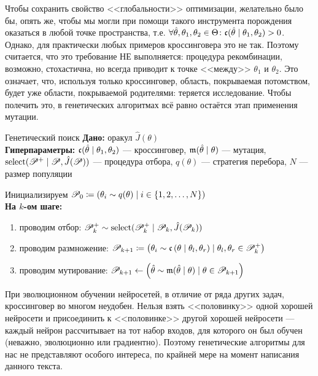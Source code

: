 Чтобы сохранить свойство <<глобальности>> оптимизации, желательно было бы, опять же, чтобы мы могли при помощи такого инструмента порождения оказаться в любой точке пространства, т.е. $\forall \hat{\theta}, \theta_1, \theta_2 \HM\in \Theta \colon \cross(\hat{\theta} \HM\mid \theta_1, \theta_2) > 0$. Однако, для практически любых примеров кроссинговера это не так. Поэтому считается, что это требование НЕ выполняется: процедура рекомбинации, возможно, стохастична, но всегда приводит к точке <<между>> $\theta_1$ и $\theta_2$. Это означает, что, используя только кроссинговер, область, покрываемая потомством, будет уже области, покрываемой родителями: теряется исследование. Чтобы полечить это, в генетических алгоритмах всё равно остаётся этап применения мутации.

\begin{algorithm}[label=geneticsearch]{Генетический поиск}
\textbf{Дано:} оракул $\hat{J}(\theta)$ \\
\textbf{Гиперпараметры:} $\mathfrak{c}(\hat{\theta} \mid \theta_1, \theta_2)$ --- кроссинговер, $\mathfrak{m}(\hat{\theta} \mid \theta)$ --- мутация, $\mathrm{select}(\mathscr{P}^+ \mid \mathscr{P}, \hat{J}(\mathscr{P}))$ --- процедура отбора, $q(\theta)$ --- стратегия перебора, $N$ --- размер популяции

\vspace{0.3cm}
Инициализируем $\mathscr{P}_0 \coloneqq \left( \theta_i \sim q(\theta) \mid i \in \{1, 2, \dots , N \} \right)$ \\
\textbf{На $k$-ом шаге:}
\begin{enumerate}
    \item проводим отбор: $\mathscr{P}^{+}_k \sim \mathrm{select}(\mathscr{P}^{+}_k \mid \mathscr{P}_k, \hat{J}(\mathscr{P}_k))$
    \item проводим размножение: $\mathscr{P}_{k+1} \coloneqq \left( \theta_i \sim \mathfrak{c} \left( \theta \mid \theta_l, \theta_r \right) \mid \theta_l, \theta_r \in \mathscr{P}^{+}_k \right)$
    \item проводим мутирование: $\mathscr{P}_{k+1} \leftarrow \left( \hat{\theta} \sim \mathfrak{m} (\hat{\theta} \mid \theta) \mid \theta \in \mathscr{P}_{k+1} \right)$
\end{enumerate}
\end{algorithm}

\begin{remark}
При эволюционном обучении нейросетей, в отличие от ряда других задач, кроссинговер во многом неудобен. Нельзя взять <<половинку>> одной хорошей нейросети и присоединить к <<половинке>> другой хорошей нейросети --- каждый нейрон рассчитывает на тот набор входов, для которого он был обучен (неважно, эволюционно или градиентно). Поэтому генетические алгоритмы для нас не представляют особого интереса, по крайней мере на момент написания данного текста. 
\end{remark}

